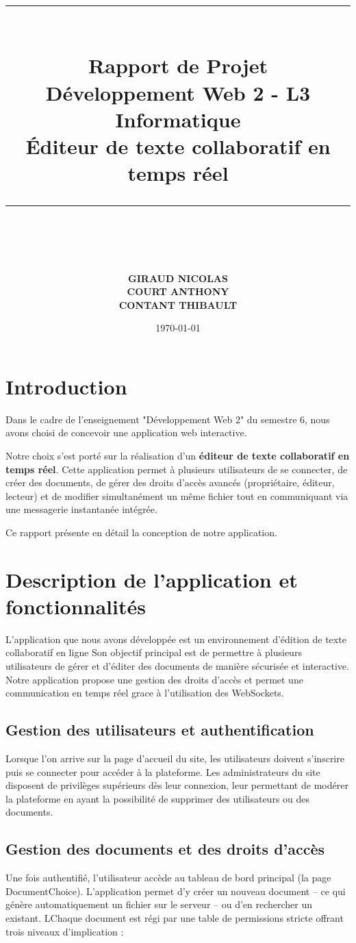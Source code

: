 \documentclass[14pt,a4paper]{extarticle}
\title{
    \vspace*{4cm}
    \rule{\linewidth}{1mm} \\[0.5cm]
    \Huge{\textbf{Rapport de Projet}} \\
    \vspace{0.5cm}
    \Large{Développement Web 2 - L3 Informatique} \\
    \vspace{0.5cm}
    \textbf{Éditeur de texte collaboratif en temps réel}
    \rule{\linewidth}{1mm} \\[4cm]
}
\author{
    	\textbf{GIRAUD NICOLAS} \\
    	\textbf{COURT ANTHONY} \\
    	\textbf{CONTANT THIBAULT}
}
\date{\vspace*{2cm} \today}
\begin{document}
\maketitle
\thispagestyle{empty}
\newpage

\tableofcontents
\thispagestyle{empty}
\newpage

\setcounter{page}{1}

\section{Introduction}
\label{sec:intro}
Dans le cadre de l'enseignement "Développement Web 2" du semestre 6, nous avons choisi de concevoir une application web interactive.

Notre choix s'est porté sur la réalisation d'un \textbf{éditeur de texte collaboratif en temps réel}. Cette application permet à plusieurs utilisateurs de se connecter, de créer des documents, de gérer des droits d'accès avancés (propriétaire, éditeur, lecteur) et de modifier simultanément un même fichier tout en communiquant via une messagerie instantanée intégrée. 

Ce rapport présente en détail la conception de notre application.

\section{Description de l'application et fonctionnalités}
\label{sec:fonctionnalites}

L’application que nous avons développée est un environnement d'édition de texte collaboratif en ligne Son objectif principal est de permettre à plusieurs utilisateurs de gérer et d'éditer des documents de manière sécurisée et interactive. Notre application propose une gestion des droits d'accès et permet une communication en temps réel grace à l'utilisation des WebSockets.

\subsection{Gestion des utilisateurs et authentification}
Lorsque l'on arrive sur la page d'accueil du site, les utilisateurs doivent s'inscrire puis se connecter pour accéder à la plateforme. Les administrateurs  du site disposent de privilèges supérieurs dès leur connexion, leur permettant de modérer la plateforme en ayant la possibilité de supprimer des utilisateurs ou des documents.

\subsection{Gestion des documents et des droits d'accès}
Une fois authentifié, l'utilisateur accède au tableau de bord principal (la page DocumentChoice). L'application permet d'y créer un nouveau document – ce qui génère automatiquement un fichier sur le serveur – ou d'en rechercher un existant. LChaque document est régi par une table de permissions stricte offrant trois niveaux d'implication :
\end{document}
